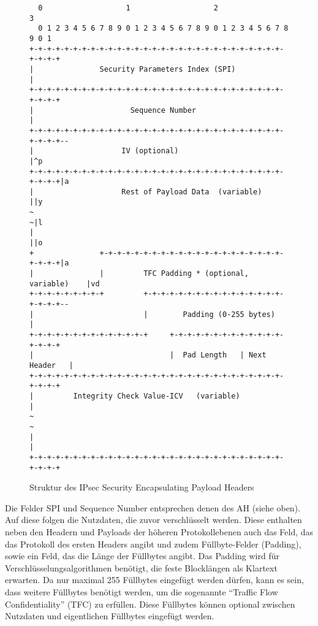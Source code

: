 \begin{figure}[!ht]
	\small
    \begin{verbatim}
  0                   1                   2                   3
  0 1 2 3 4 5 6 7 8 9 0 1 2 3 4 5 6 7 8 9 0 1 2 3 4 5 6 7 8 9 0 1
+-+-+-+-+-+-+-+-+-+-+-+-+-+-+-+-+-+-+-+-+-+-+-+-+-+-+-+-+-+-+-+-+
|               Security Parameters Index (SPI)                 |
+-+-+-+-+-+-+-+-+-+-+-+-+-+-+-+-+-+-+-+-+-+-+-+-+-+-+-+-+-+-+-+-+
|                      Sequence Number                          |
+-+-+-+-+-+-+-+-+-+-+-+-+-+-+-+-+-+-+-+-+-+-+-+-+-+-+-+-+-+-+-+-+--
|                    IV (optional)                              |^p
+-+-+-+-+-+-+-+-+-+-+-+-+-+-+-+-+-+-+-+-+-+-+-+-+-+-+-+-+-+-+-+-+|a
|                    Rest of Payload Data  (variable)           ||y
~                                                               ~|l
|                                                               ||o
+               +-+-+-+-+-+-+-+-+-+-+-+-+-+-+-+-+-+-+-+-+-+-+-+-+|a
|               |         TFC Padding * (optional, variable)    |vd
+-+-+-+-+-+-+-+-+         +-+-+-+-+-+-+-+-+-+-+-+-+-+-+-+-+-+-+-+--
|                         |        Padding (0-255 bytes)        |
+-+-+-+-+-+-+-+-+-+-+-+-+-+     +-+-+-+-+-+-+-+-+-+-+-+-+-+-+-+-+
|                               |  Pad Length   | Next Header   |
+-+-+-+-+-+-+-+-+-+-+-+-+-+-+-+-+-+-+-+-+-+-+-+-+-+-+-+-+-+-+-+-+
|         Integrity Check Value-ICV   (variable)                |
~                                                               ~
|                                                               |
+-+-+-+-+-+-+-+-+-+-+-+-+-+-+-+-+-+-+-+-+-+-+-+-+-+-+-+-+-+-+-+-+
	\end{verbatim}
    \caption{Struktur des IPsec Security Encapsulating Payload Headers}
\end{figure}

Die Felder SPI und Sequence Number entsprechen denen des AH (siehe oben).
Auf diese folgen die Nutzdaten, die zuvor verschlüsselt werden. Diese enthalten neben den Headern und Payloads der höheren Protokollebenen auch das Feld, das das Protokoll des ersten Headers angibt und zudem Füllbyte-Felder (Padding), sowie ein Feld, das die Länge der Füllbytes angibt. Das Padding wird für Verschlüsselungsalgorithmen benötigt, die feste Blocklängen als Klartext erwarten. Da nur maximal 255 Füllbytes eingefügt werden dürfen, kann es sein, dass weitere Füllbytes benötigt werden, um die sogenannte “Traffic Flow Confidentiality” (TFC) zu erfüllen. Diese Füllbytes können optional zwischen Nutzdaten und eigentlichen Füllbytes eingefügt werden.

